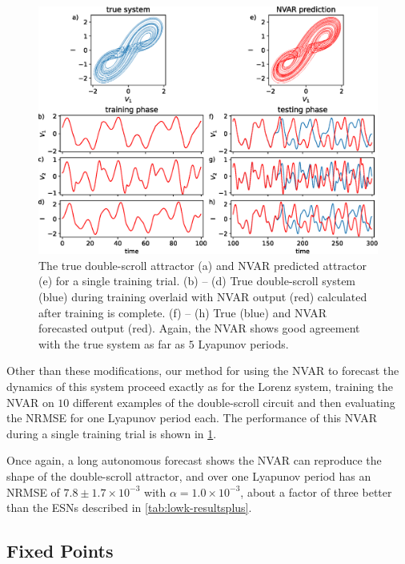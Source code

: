 \begin{figure}
  \includegraphics[width=\textwidth]{figures/nvar-predict-dscroll}
  \caption{The true double-scroll attractor (a) and NVAR predicted
    attractor (e) for a single training trial. (b) -- (d) True
    double-scroll system (blue) during training overlaid with NVAR
    output (red) calculated after training is complete. (f) -- (h)
    True (blue) and NVAR forecasted output (red). Again, the NVAR
    shows good agreement with the true system as far as $5$ Lyapunov
    periods.}
  \label{fig:nvar-predict-dscroll}
\end{figure}

Other than these modifications, our method for using the NVAR to
forecast the dynamics of this system proceed exactly as for the Lorenz
system, training the NVAR on $10$ different examples of the
double-scroll circuit and then evaluating the NRMSE for one Lyapunov
period each. The performance of this NVAR during a single training
trial is shown in \cref{fig:nvar-predict-dscroll}.

Once again, a long autonomous forecast shows the NVAR can reproduce
the shape of the double-scroll attractor, and over one Lyapunov period
has an NRMSE of $7.8\pm1.7\times10^{-3}$ with $\alpha =
1.0\times10^{-3}$, about a factor of three better than the ESNs
described in \cref{tab:lowk-resultsplus}.

\subsection{Fixed Points}

